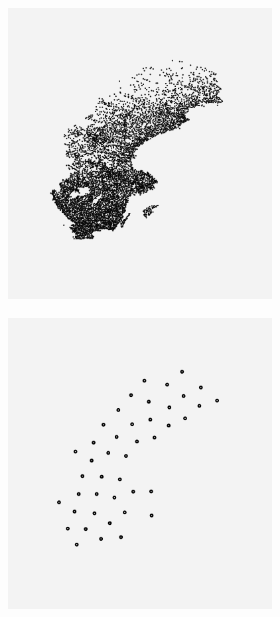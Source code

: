 \begin{figure}[H]
\begin{subfigure}[b]{1\linewidth}
\begin{subfigure}[t]{0.29\linewidth}
		\caption{} 
		\label{fig:bp10_1_sweden} 
		\vspace{4ex}
	\end{subfigure}
	\begin{subfigure}[t]{0.29\linewidth}
		\centering
		\includegraphics[width=0.9\linewidth]{Pictures/bp5_1_sweden}
		\caption{} 
		\label{fig:bp5_1_sweden} 
		\vspace{4ex}
	\end{subfigure}
\end{subfigure}
\begin{subfigure}[b]{1\linewidth}
	\centering
  \begin{subfigure}[b]{0.29\linewidth}
  	\centering
  	\includegraphics[width=0.9\linewidth]{Pictures/ls_10_sweden} 

\end{subfigure}
\end{subfigure}
\end{figure}
